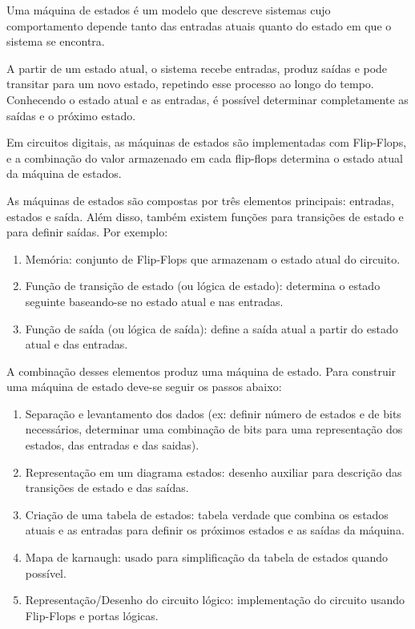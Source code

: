 \documentclass[12pt]{article}
\begin{document}
Uma máquina de estados é um modelo que descreve sistemas cujo comportamento depende tanto das entradas atuais quanto do estado em que o sistema se encontra. 

A partir de um estado atual, o sistema recebe entradas, produz saídas e pode transitar para um novo estado, repetindo esse processo ao longo do tempo. Conhecendo o estado atual e as entradas, é possível determinar completamente as saídas e o próximo estado. 

Em circuitos digitais, as máquinas de estados são implementadas com Flip-Flops, e a combinação do valor armazenado em cada flip-flops determina o estado atual da máquina de estados.

As máquinas de estados são compostas por três elementos principais: entradas, estados e saída. Além disso, também existem funções para transições de estado e para definir saídas. Por exemplo:

\begin{enumerate}
    \item Memória: conjunto de Flip-Flops que armazenam o estado atual do circuito.
    \item Função de transição de estado (ou lógica de estado): determina o estado seguinte baseando-se no estado atual e nas entradas.
    \item Função de saída (ou lógica de saída): define a saída atual a partir do estado atual e das entradas.
\end{enumerate} 
A combinação desses elementos produz uma máquina de estado.
Para construir uma máquina de estado deve-se seguir os passos abaixo:
\begin{enumerate}
    \item Separação e levantamento dos dados (ex: definir número de estados e de bits necessários, determinar uma combinação de bits para uma representação dos estados, das entradas e das saidas).
    \item Representação em um diagrama estados: desenho auxiliar para descrição das transições de estado e das saídas.
    \item Criação de uma tabela de estados: tabela verdade que combina os estados atuais e as entradas para definir os próximos estados e as saídas da máquina.  
    \item Mapa de karnaugh: usado para simplificação da tabela de estados quando possível. 
    \item Representação/Desenho do circuito lógico: implementação do circuito usando Flip-Flops e portas lógicas.
\end{enumerate} 
\end{document}
